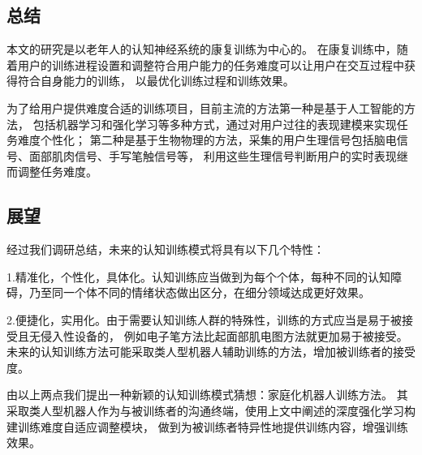 \documentclass{article}
\begin{document}
    \subsection{总结}
    本文的研究是以老年人的认知神经系统的康复训练为中心的。
    在康复训练中，随着用户的训练进程设置和调整符合用户能力的任务难度可以让用户在交互过程中获得符合自身能力的训练，
    以最优化训练过程和训练效果。
    
    为了给用户提供难度合适的训练项目，目前主流的方法第一种是基于人工智能的方法，
    包括机器学习和强化学习等多种方式，通过对用户过往的表现建模来实现任务难度个性化；
    第二种是基于生物物理的方法，采集的用户生理信号包括脑电信号、面部肌肉信号、手写笔触信号等，
    利用这些生理信号判断用户的实时表现继而调整任务难度。

    \subsection{展望}
    经过我们调研总结，未来的认知训练模式将具有以下几个特性：

    1.精准化，个性化，具体化。认知训练应当做到为每个个体，每种不同的认知障碍，乃至同一个体不同的情绪状态做出区分，在细分领域达成更好效果。

    2.便捷化，实用化。由于需要认知训练人群的特殊性，训练的方式应当是易于被接受且无侵入性设备的，
    例如电子笔方法比起面部肌电图方法就更加易于被接受。未来的认知训练方法可能采取类人型机器人辅助训练的方法，增加被训练者的接受度。

    由以上两点我们提出一种新颖的认知训练模式猜想：家庭化机器人训练方法。
    其采取类人型机器人作为与被训练者的沟通终端，使用上文中阐述的深度强化学习构建训练难度自适应调整模块，
    做到为被训练者特异性地提供训练内容，增强训练效果。
\end{document}
